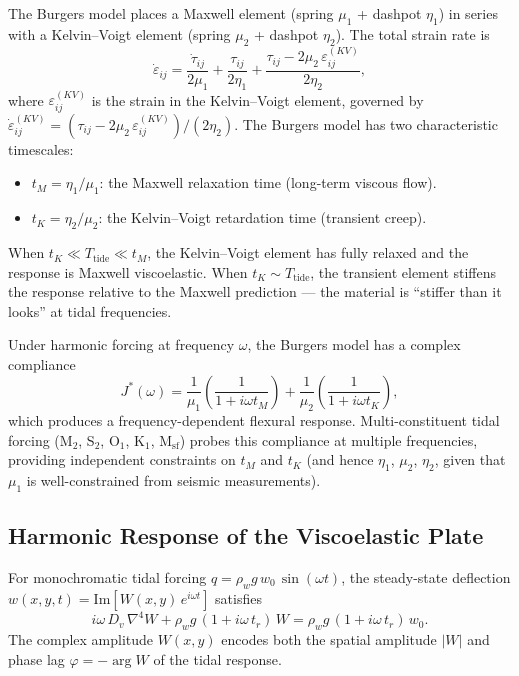 \documentclass[11pt,letterpaper]{article}
\begin{document}
The Burgers model places a Maxwell element (spring $\mu_1$ + dashpot $\eta_1$) in series with a Kelvin--Voigt element (spring $\mu_2$ + dashpot $\eta_2$).  The total strain rate is
\begin{equation}
  \dot{\varepsilon}_{ij} = \frac{\dot{\tau}_{ij}}{2\mu_1} + \frac{\tau_{ij}}{2\eta_1} + \frac{\tau_{ij} - 2\mu_2\,\varepsilon_{ij}^{(KV)}}{2\eta_2},
\end{equation}
where $\varepsilon_{ij}^{(KV)}$ is the strain in the Kelvin--Voigt element, governed by $\dot{\varepsilon}_{ij}^{(KV)} = (\tau_{ij} - 2\mu_2\,\varepsilon_{ij}^{(KV)}) / (2\eta_2)$.  The Burgers model has two characteristic timescales:
\begin{itemize}
  \item $t_M = \eta_1/\mu_1$: the Maxwell relaxation time (long-term viscous flow).
  \item $t_K = \eta_2/\mu_2$: the Kelvin--Voigt retardation time (transient creep).
\end{itemize}
When $t_K \ll T_{\text{tide}} \ll t_M$, the Kelvin--Voigt element has fully relaxed and the response is Maxwell viscoelastic.  When $t_K \sim T_{\text{tide}}$, the transient element stiffens the response relative to the Maxwell prediction --- the material is ``stiffer than it looks'' at tidal frequencies.

Under harmonic forcing at frequency $\omega$, the Burgers model has a complex compliance
\begin{equation}
  J^*(\omega) = \frac{1}{\mu_1}\!\left(\frac{1}{1 + i\omega t_M}\right) + \frac{1}{\mu_2}\!\left(\frac{1}{1 + i\omega t_K}\right),
\end{equation}
which produces a frequency-dependent flexural response.  Multi-constituent tidal forcing (M$_2$, S$_2$, O$_1$, K$_1$, M$_{\text{sf}}$) probes this compliance at multiple frequencies, providing independent constraints on $t_M$ and $t_K$ (and hence $\eta_1$, $\mu_2$, $\eta_2$, given that $\mu_1$ is well-constrained from seismic measurements).

\subsection{Harmonic Response of the Viscoelastic Plate}
\label{sec:harmonic}

For monochromatic tidal forcing $q = \rho_w g\,w_0\,\sin(\omega t)$, the steady-state deflection $w(x,y,t) = \text{Im}[W(x,y)\,e^{i\omega t}]$ satisfies
\begin{equation}
  i\omega\,D_v\,\nabla^4 W + \rho_w g\,(1 + i\omega\,t_r)\,W = \rho_w g\,(1 + i\omega\,t_r)\,w_0.
  \label{eq:harmonic_plate}
\end{equation}
The complex amplitude $W(x,y)$ encodes both the spatial amplitude $|W|$ and phase lag $\varphi = -\arg W$ of the tidal response.
\end{document}
